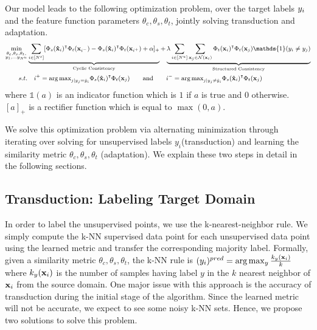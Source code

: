Our model leads to the following optimization problem, over the target labels $y_i$ and the feature function parameters $\theta_c, \theta_s, \theta_t$, jointly solving transduction and adaptation. 
\begin{equation}
\small
\begin{aligned}
\min_{\substack{\theta_c,\theta_s,\theta_t, \\ y_1, \ldots y_{N^u}}} &\underbrace{\sum_{i \in [N^s]} [\Phi_s(\xsi)^\intercal \Phi_t(\mathbf{x}_{i^-}) -\Phi_s(\xsi)^\intercal \Phi_t(\mathbf{x}_{i^+}) + \alpha]_{+}}_{\text{Cyclic Consistency}}  +\underbrace{\lambda \sum_{i \in [N^u]} \sum_{\xuj \in \mathcal{N}(\xui)}  \Phi_t(\xui)^\intercal \Phi_t(\xuj) \mathds{1}(y_i \neq y_j)}_{\text{Structured Consistency}}\\
s.t. &\quad i^{+} = {\arg\max}_{j | y_j = \hat{y}_i} \Phi_s(\xsi)^\intercal \Phi_t(\xuj) \quad \quad \text{and} \quad \quad  i^{-} = {\arg\max}_{j | y_j \neq \hat{y}_i}  \Phi_s(\xsi)^\intercal \Phi_t(\xuj)
\end{aligned}
\label{loss}
\end{equation}
where $\mathds{1}(a)$ is an indicator function which is $1$ if $a$ is true and $0$ otherwise. $[a]_+$ is a rectifier function which is equal to $\max(0, a)$.


We solve this optimization problem via alternating minimization through iterating over solving for unsupervised labels $y_i$(transduction) and learning the similarity metric $\theta_c,\theta_s,\theta_t$ (adaptation). We explain these two steps in detail in the following sections.




\subsection{Transduction: Labeling Target Domain}
\label{label}
In order to label the unsupervised points, we use the k-nearest-neighbor rule. We simply compute the k-NN supervised data point for each unsupervised data point using the learned metric and transfer the corresponding majority label. Formally, given a similarity metric $\theta_c, \theta_s, \theta_t$, the k-NN rule is 
$(y_i)^{pred} = \arg\max_y \frac{k_y(\mathbf{x}_i)}{k}$ where $k_y(\mathbf{x}_i)$ is the number of samples having label $y$ in the $k$ nearest neighbor of $\mathbf{x}_i$ from the source domain. One major issue with this approach is the accuracy of transduction during the initial stage of the algorithm. Since the learned metric will not be accurate, we expect to see some noisy k-NN sets. Hence, we propose two solutions to solve this problem.

